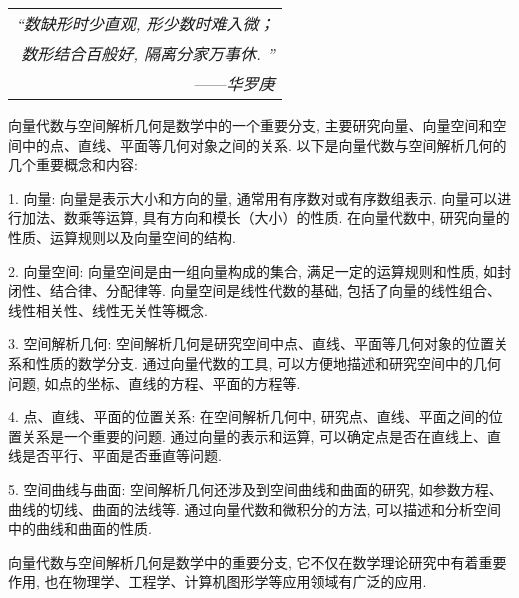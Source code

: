 \begin{flushright}
    \begin{tabular}{r|}
        \textit{“数缺形时少直观, 形少数时难入微；}\\
        \textit{数形结合百般好, 隔离分家万事休. ”}\\
        ——\textit{华罗庚}
    \end{tabular}
\end{flushright}

向量代数与空间解析几何是数学中的一个重要分支, 主要研究向量、向量空间和空间中的点、直线、平面等几何对象之间的关系. 以下是向量代数与空间解析几何的几个重要概念和内容: 

1. 向量: 向量是表示大小和方向的量, 通常用有序数对或有序数组表示. 向量可以进行加法、数乘等运算, 具有方向和模长（大小）的性质. 在向量代数中, 研究向量的性质、运算规则以及向量空间的结构. 

2. 向量空间: 向量空间是由一组向量构成的集合, 满足一定的运算规则和性质, 如封闭性、结合律、分配律等. 向量空间是线性代数的基础, 包括了向量的线性组合、线性相关性、线性无关性等概念. 

3. 空间解析几何: 空间解析几何是研究空间中点、直线、平面等几何对象的位置关系和性质的数学分支. 通过向量代数的工具, 可以方便地描述和研究空间中的几何问题, 如点的坐标、直线的方程、平面的方程等. 

4. 点、直线、平面的位置关系: 在空间解析几何中, 研究点、直线、平面之间的位置关系是一个重要的问题. 通过向量的表示和运算, 可以确定点是否在直线上、直线是否平行、平面是否垂直等问题. 

5. 空间曲线与曲面: 空间解析几何还涉及到空间曲线和曲面的研究, 如参数方程、曲线的切线、曲面的法线等. 通过向量代数和微积分的方法, 可以描述和分析空间中的曲线和曲面的性质. 

向量代数与空间解析几何是数学中的重要分支, 它不仅在数学理论研究中有着重要作用, 也在物理学、工程学、计算机图形学等应用领域有广泛的应用. 
